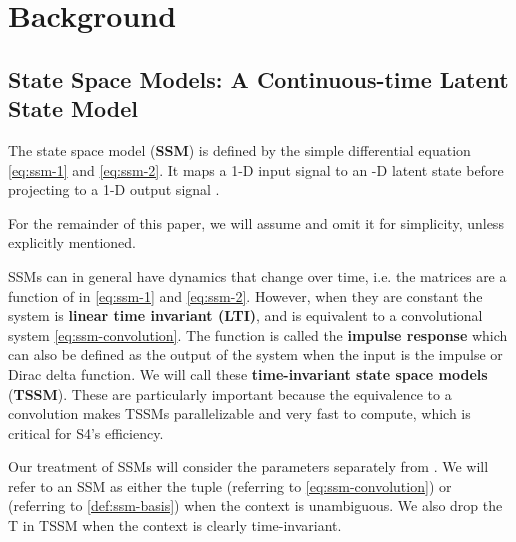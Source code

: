 \documentclass{article}
\begin{document}
 
\section{Background}
\label{sec:background}



\subsection{State Space Models: A Continuous-time Latent State Model}
\label{sec:ss-continuous}

The state space model (\textbf{SSM}) is defined by the simple differential equation \eqref{eq:ssm-1} and \eqref{eq:ssm-2}.
It maps a 1-D input signal  to an -D latent state 
before projecting to a 1-D output signal .

\begin{minipage}{.5\linewidth}
  \noindent
  \vspace*{-8pt}
  
\end{minipage}
\begin{minipage}{.5\linewidth}
  \vspace*{4pt}
  
\end{minipage}

For the remainder of this paper, we will assume  and omit it for simplicity, unless explicitly mentioned. 

SSMs can in general have dynamics that change over time, i.e. the matrices  are a function of  in \eqref{eq:ssm-1} and \eqref{eq:ssm-2}.
However, when they are constant
the system is \textbf{linear time invariant (LTI)}, and is equivalent to a convolutional system \eqref{eq:ssm-convolution}.
The function  is called the \textbf{impulse response} which can also be defined as the output of the system when the input  is the impulse or Dirac delta function.
We will call these \textbf{time-invariant state space models} (\textbf{TSSM}).
These are particularly important because the equivalence to a convolution makes TSSMs parallelizable and very fast to compute, which is critical for S4's efficiency.

Our treatment of SSMs will consider the  parameters separately from .
We will refer to an SSM as either the tuple  (referring to \eqref{eq:ssm-convolution}) or  (referring to \cref{def:ssm-basis}) when the context is unambiguous.
We also drop the T in TSSM when the context is clearly time-invariant.
\end{document}
